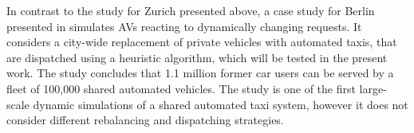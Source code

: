 In contrast to the study for Zurich presented above, a case study for Berlin
presented in \cite{bischoff2016simulation} simulates AVs reacting to dynamically changing requests.
It considers a city-wide replacement of private vehicles with automated taxis, that
are dispatched using a heuristic algorithm, which will be tested in the present work.
 The study concludes that 1.1 million former car users can be served by a fleet
 of 100,000 shared automated vehicles.
The study is one of the first large-scale dynamic
 simulations of a shared automated taxi system, however it does not consider
 different rebalancing and dispatching strategies.








